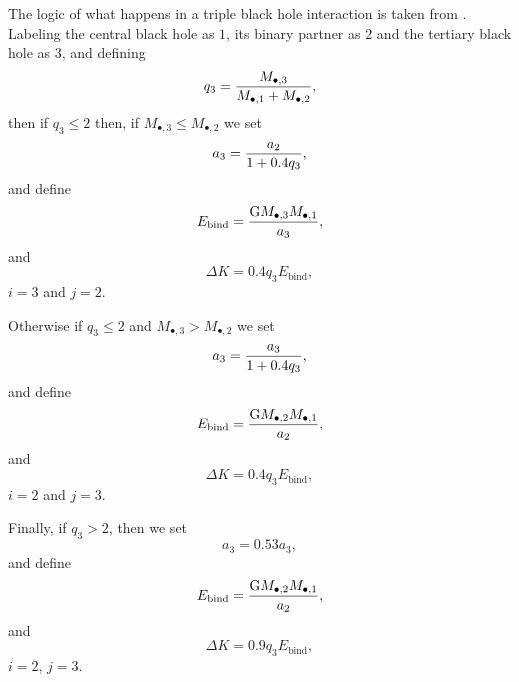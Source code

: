 The logic of what happens in a triple black hole interaction is taken from \cite{volonteri_assembly_2003}. Labeling the central black hole as $1$, its binary partner as $2$ and the tertiary black hole as $3$, and defining
\begin{equation}
q_3 = {M_{\bullet, 3} \over M_{\bullet, 1} + M_\mathrm{\bullet, 2} },
\end{equation}
then if $q_3 \le 2$ then, if $M_{\bullet, 3} \le M_\mathrm{\bullet, 2}$ we set
\begin{equation}
a_3 = {a_2 \over 1 + 0.4 q_3}, 
\end{equation}
and define
\begin{equation}
E_\mathrm{bind} = {\mathrm{G} M_{\bullet, 3} M_{\bullet, 1} \over a_3},
\end{equation}
and
\begin{equation}
\Delta K =0.4 q_3 E_\mathrm{bind},
\end{equation}
$i=3$ and $j=2$. 

Otherwise if $q_3 \le 2$ and $M_{\bullet, 3} > M_\mathrm{\bullet, 2}$ we set
\begin{equation}
a_3 = { a_3 \over 1 +0.4 q_3},
\end{equation}
and define
\begin{equation}
E_\mathrm{bind} = {\mathrm{G} M_{\bullet, 2} M_{\bullet, 1} \over a_2},
\end{equation}
and
\begin{equation}
 \Delta K =0.4 q_3 E_\mathrm{bind},
\end{equation}
$i=2$ and $j=3$.

Finally, if $q_3 > 2$, then we set
\begin{equation}
a_3 =0.53 a_3,
\end{equation}
and define
\begin{equation}
E_\mathrm{bind} = {\mathrm{G} M_{\bullet, 2} M_{\bullet, 1} \over a_2},
\end{equation}
and
\begin{equation}
\Delta K =0.9 q_3 E_\mathrm{bind},
\end{equation}
$i=2$, $j=3$.

